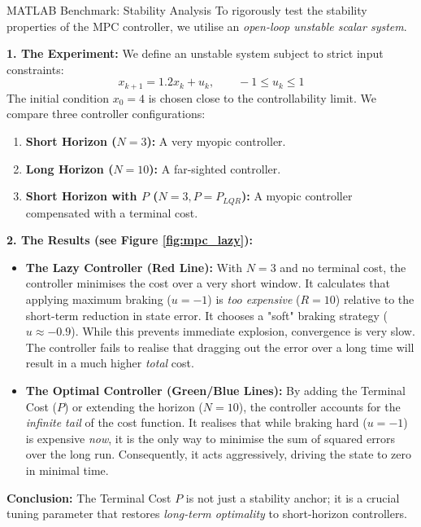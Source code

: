 \begin{examplebox}{MATLAB Benchmark: Stability Analysis}
	To rigorously test the stability properties of the MPC controller, we utilise an \emph{open-loop unstable scalar system}.
	
	\textbf{1. The Experiment:}
	We define an unstable system subject to strict input constraints:
	\begin{equation*}
		x_{k+1} = 1.2 x_k + u_k, \qquad -1 \leq u_k \leq 1
	\end{equation*}
	The initial condition $x_0 = 4$ is chosen close to the controllability limit. We compare three controller configurations:
	\begin{enumerate}
		\item \textbf{Short Horizon ($N=3$):} A very myopic controller.
		\item \textbf{Long Horizon ($N=10$):} A far-sighted controller.
		\item \textbf{Short Horizon with $P$ ($N=3, P=P_{LQR}$):} A myopic controller compensated with a terminal cost.
	\end{enumerate}
	
	\textbf{2. The Results (see Figure \ref{fig:mpc_lazy}):}
	\begin{itemize}
		\item \textbf{The Lazy Controller (Red Line):} 
		With $N=3$ and no terminal cost, the controller minimises the cost over a very short window. It calculates that applying maximum braking ($u=-1$) is \emph{too expensive} ($R=10$) relative to the short-term reduction in state error. It chooses a "soft" braking strategy ($u \approx -0.9$). While this prevents immediate explosion, convergence is very slow. The controller fails to realise that dragging out the error over a long time will result in a much higher \textit{total} cost.
		
		\item \textbf{The Optimal Controller (Green/Blue Lines):} 
		By adding the Terminal Cost ($P$) or extending the horizon ($N=10$), the controller accounts for the \emph{infinite tail} of the cost function. It realises that while braking hard ($u=-1$) is expensive \textit{now}, it is the only way to minimise the sum of squared errors over the long run. Consequently, it acts aggressively, driving the state to zero in minimal time.
	\end{itemize}
	
	\textbf{Conclusion:} The Terminal Cost $P$ is not just a stability anchor; it is a crucial tuning parameter that restores \emph{long-term optimality} to short-horizon controllers.
\end{examplebox}

